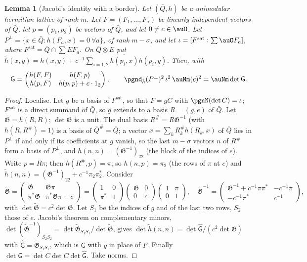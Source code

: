 \documentclass[10pt]{amsart}
\newtheorem{lemma}[theorem]{Lemma}
\theoremstyle{definition}
\theoremstyle{remark}
\providecommand{\aubar}[1]{\overline{#1}}
\begin{document}
\begin{lemma}[Jacobi's identity with a border]\label{pbg:jacobi}
Let $(\bar Q,h)$ be a unimodular hermitian lattice of rank $m$. Let $F=(F_1,\dots,F_\sigma)$ be
linearly independent vectors of $\bar Q$, let $p=(p_1,p_2)$ be vectors of $\bar Q$, and let $0\ne
c\in\auO$. Let $P^\perp=\{x\in\bar Q:h(F_a,x)=0\ \forall a\}$, of rank $m-\sigma$, and let $\iota=
[F^{\mathrm{sat}}:\textstyle\sum\auO F_a]$, where $F^{\mathrm{sat}}=\bar Q\cap\sum EF_a$. On $\bar
Q\otimes E$ put $\tilde h(x,y)=h(x,y)+c^{-1}\sum_{i=1,2}\aubar{h(p_i,x)}h(p_i,y)$. Then, with
\[
\mathsf G=\begin{pmatrix}h(F,F)&h(F,p)\\h(p,F)&h(p,p)+c\cdot1_2\end{pmatrix},
\qquad
\pgnd_{\tilde h}(P^\perp)^2\,\iota^2\,\auNm(c)^2=\auNm\det\mathsf G .
\]
\end{lemma}
\begin{proof}
Localise. Let $g$ be a basis of $F^{\mathrm{sat}}$, so that $F=gC$ with $\pgnN(\det C)=\iota$;
$F^{\mathrm{sat}}$ is a direct summand of $\bar Q$, so $g$ extends to a basis $R=(g,e)$ of $\bar Q$.
Let $\mathfrak G=h(R,R)$; $\det\mathfrak G$ is a unit. The dual basis $R^\#=R\mathfrak G^{-1}$
(with $h(R,R^\#)=1$) is a basis of $\bar Q^\#=\bar Q$; a vector $x=\sum_kR^\#_kh(R_k,x)$ of $\bar Q$
lies in $P^\perp$ if and only if its coefficients at $g$ vanish, so the last $m-\sigma$ vectors $n$ of
$R^\#$ form a basis of $P^\perp$, and $h(n,n)=(\mathfrak G^{-1})_{22}$ (the block of the indices of
$e$). Write $p=R\pi$; then $h(R^\#,p)=\pi$, so $h(n,p)=\pi_2$ (the rows of $\pi$ at $e$) and
$\tilde h(n,n)=(\mathfrak G^{-1})_{22}+c^{-1}\pi_2\pi_2^*$. Consider
\[
\tilde{\mathfrak G}=\begin{pmatrix}\mathfrak G&\mathfrak G\pi\\\pi^*\mathfrak G&\pi^*\mathfrak
G\pi+c\end{pmatrix}=\begin{pmatrix}1&0\\\pi^*&1\end{pmatrix}\begin{pmatrix}\mathfrak G&0\\0&c
\end{pmatrix}\begin{pmatrix}1&\pi\\0&1\end{pmatrix},\quad
\tilde{\mathfrak G}^{-1}=\begin{pmatrix}\mathfrak G^{-1}+c^{-1}\pi\pi^*&-c^{-1}\pi\\-c^{-1}\pi^*&c^{-1}
\end{pmatrix},
\]
with $\det\tilde{\mathfrak G}=c^2\det\mathfrak G$. Let $S_1$ be the indices of $g$ and of the last two
rows, $S_2$ those of $e$. Jacobi's theorem on complementary minors, $\det(\tilde{\mathfrak
G}^{-1})_{S_2S_2}=\det\tilde{\mathfrak G}_{S_1S_1}/\det\tilde{\mathfrak G}$, gives $\det\tilde
h(n,n)=\det\hat{\mathsf G}/(c^2\det\mathfrak G)$ with $\hat{\mathsf G}=\tilde{\mathfrak G}_{S_1S_1}$,
which is $\mathsf G$ with $g$ in place of $F$. Finally $\det\mathsf G=\aubar{\det C}\det C\det\hat{
\mathsf G}$. Take norms.
\end{proof}
\end{document}
